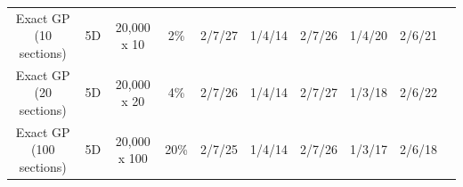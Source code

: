 \begin{table}
\begin{tabular}{cccccccccc}
		 Exact GP (10 sections) & 5D& 20,000 x 10 & 2\% & 2/7/27  & 1/4/14 & 2/7/26 &1/4/20 & 2/6/21\\
		 Exact GP (20 sections) & 5D& 20,000 x 20 & 4\% & 2/7/26  & 1/4/14 & 2/7/27 &1/3/18 & 2/6/22 \\
		  Exact GP (100 sections) & 5D& 20,000 x 100 & 20\% & 2/7/25  & 1/4/14 & 2/7/26 &1/3/17 & 2/6/18 \\
		  \hline
	\end{tabular}
\end{table}

